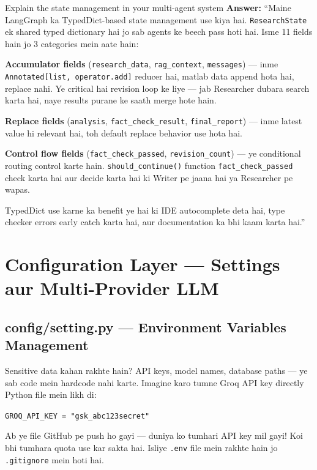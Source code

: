 \documentclass[11pt,a4paper,twoside]{report}
\begin{document}
\begin{interviewbox}{Explain the state management in your multi-agent system}
\textbf{Answer:} ``Maine LangGraph ka TypedDict-based state management use kiya hai. \texttt{ResearchState} ek shared typed dictionary hai jo sab agents ke beech pass hoti hai. Isme 11 fields hain jo 3 categories mein aate hain:

\textbf{Accumulator fields} (\texttt{research\_data}, \texttt{rag\_context}, \texttt{messages}) --- inme \texttt{Annotated[list, operator.add]} reducer hai, matlab data append hota hai, replace nahi. Ye critical hai revision loop ke liye --- jab Researcher dubara search karta hai, naye results purane ke saath merge hote hain.

\textbf{Replace fields} (\texttt{analysis}, \texttt{fact\_check\_result}, \texttt{final\_report}) --- inme latest value hi relevant hai, toh default replace behavior use hota hai.

\textbf{Control flow fields} (\texttt{fact\_check\_passed}, \texttt{revision\_count}) --- ye conditional routing control karte hain. \texttt{should\_continue()} function \texttt{fact\_check\_passed} check karta hai aur decide karta hai ki Writer pe jaana hai ya Researcher pe wapas.

TypedDict use karne ka benefit ye hai ki IDE autocomplete deta hai, type checker errors early catch karta hai, aur documentation ka bhi kaam karta hai.''
\end{interviewbox}



\chapter{Configuration Layer --- Settings aur Multi-Provider LLM}

\section{config/setting.py --- Environment Variables Management}

\begin{storybox}{Sensitive data kahan rakhte hain?}
API keys, model names, database paths --- ye sab code mein hardcode nahi karte. Imagine karo tumne Groq API key directly Python file mein likh di:

\texttt{GROQ\_API\_KEY = "gsk\_abc123secret"}

Ab ye file GitHub pe push ho gayi --- duniya ko tumhari API key mil gayi! Koi bhi tumhara quota use kar sakta hai. Isliye \texttt{.env} file mein rakhte hain jo \texttt{.gitignore} mein hoti hai.
\end{storybox}
\end{document}
